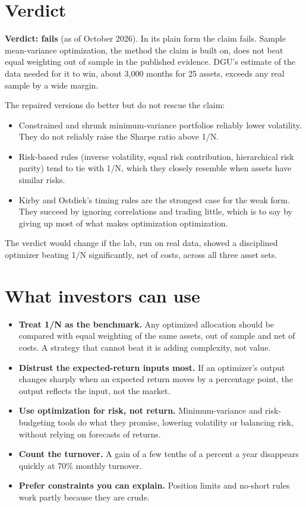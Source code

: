 \section{Verdict}
\label{sec:19-verdict}

\begin{callout}
\textbf{Verdict: fails} (as of October 2026). In its plain form the claim fails. Sample mean-variance optimization, the method the claim is built on, does not beat equal weighting out of sample in the published evidence. DGU's estimate of the data needed for it to win, about 3,000 months for 25 assets, exceeds any real sample by a wide margin.
\end{callout}

The repaired versions do better but do not rescue the claim:

\begin{itemize}
  \item Constrained and shrunk minimum-variance portfolios reliably lower volatility. They do not reliably raise the Sharpe ratio above 1/N.
  \item Risk-based rules (inverse volatility, equal risk contribution, hierarchical risk parity) tend to tie with 1/N, which they closely resemble when assets have similar risks.
  \item Kirby and Ostdiek's timing rules are the strongest case for the weak form. They succeed by ignoring correlations and trading little, which is to say by giving up most of what makes optimization optimization.
\end{itemize}

The verdict would change if the lab, run on real data, showed a disciplined optimizer beating 1/N significantly, net of costs, across all three asset sets.

\section{What investors can use}
\label{sec:19-investors}

\begin{itemize}
  \item \textbf{Treat 1/N as the benchmark.} Any optimized allocation should be compared with equal weighting of the same assets, out of sample and net of costs. A strategy that cannot beat it is adding complexity, not value.
  \item \textbf{Distrust the expected-return inputs most.} If an optimizer's output changes sharply when an expected return moves by a percentage point, the output reflects the input, not the market.
  \item \textbf{Use optimization for risk, not return.} Minimum-variance and risk-budgeting tools do what they promise, lowering volatility or balancing risk, without relying on forecasts of returns.
  \item \textbf{Count the turnover.} A gain of a few tenths of a percent a year disappears quickly at 70\% monthly turnover.
  \item \textbf{Prefer constraints you can explain.} Position limits and no-short rules work partly because they are crude.
\end{itemize}

